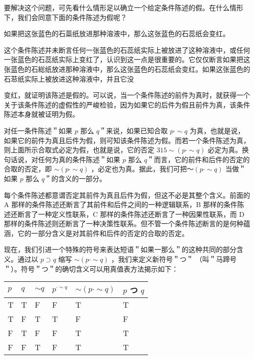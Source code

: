 要解决这个问题，可先看什么情形足以确立一个给定条件陈述的假。在什么情形下，我们会同意下面的条件陈述为假呢？

\begin{displayquote}
如果把这张蓝色的石蘂纸放进那种溶液中，那么这张蓝色的石蕊纸会变红。
\end{displayquote}

这个条件陈述并未断言任何一张蓝色的石蕊纸实际上被放进了这种溶液中，或任何一张蓝色的石蕊纸实际上变红了，认识到这一点是很重要的。它仅仅断言如果把这张蓝色的石総纸放进那种溶液中，那么这张蓝色的石蕊纸会变红。如果这张蓝色的石䓗纸实际上被放进这种溶液中，并且它没

变红，就证明该陈述是假的。可以说，当一个条件陈述的前件为真时，就获得一个关于该条件陈述的虚假性的严峻检验，因为如果它的后件为假且前件为真，该条件陈述本身就被证明为假。

对任一条件陈述＂如果 $p$ 那么 $q$＂来说，如果已知合取 $p \cdot \sim q$ 为真，也就是说，如果它的前件为真且后件为假，则可知该条件陈述为假。而若一个条件陈述为真，则上面所示合取式必定为假，也就是说，它的否定 $315 \sim(p \cdot \sim q)$ 必定为真。换句话说，对任何为真的条件陈述＂如果 $p$ 那么 $q$＂而言，它的前件和后件的否定的合取的否定，即 $\sim(p \cdot \sim q)$ ，必定也为真。据此，我们可把～$(p \cdot \sim q)$ 当做＂如果 $p$ 那么 $q$＂的含义的一部分。

每个条件陈述都意谓否定其前件为真且后件为假，但这不必是其整个含义。前面的 A 那样的条件陈述还断言了其前件和后件之间的一种逻辑联系，B 那样的条件陈述还断言了一种定义性联系，C 那样的条件陈述还断言了一种因果性联系，而 D 那样的条件陈述则还断言了一种决策性联系。但不管一个条件陈述断言的是何种蕴涵，它的一部分含义是对其前件和后件的否定的合取的否定。

现在，我们引进一个特殊的符号来表达短语＂如果一那么＂的这种共同的部分含义。通过以 $p \supset q$ 缩写 $\sim(p \cdot \sim q)$ ，我们来定义新符号＂つ＂ （叫＂马蹄号＂）。符号＂つ＂的确切含义可以用真值表方法揭示如下：

\begin{center}
\begin{tabular}{|l|l|l|l|l|l|}
\hline
$p$ & $q$ & $\sim q$ & $p^{\cdot \sim q}$ & $\sim(p \cdot \sim q)$ & $p$ つ $q$ \\
\hline
T & T & F & F & T & T \\
\hline
T & F & T & T & F & F \\
\hline
F & T & F & F & T & T \\
\hline
F & F & T & F & T & T \\
\hline
\end{tabular}
\end{center}

